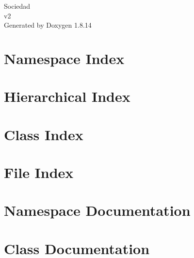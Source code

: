 \documentclass[twoside]{book}
\newcommand{\+}{\discretionary{\mbox{\scriptsize$\hookleftarrow$}}{}{}}
\newcommand{\clearemptydoublepage}{%
  \newpage{\pagestyle{empty}\cleardoublepage}%
}
\begin{document}
\hypersetup{pageanchor=false,
             bookmarksnumbered=true,
             pdfencoding=unicode
            }
\begin{titlepage}
\vspace*{7cm}
\begin{center}%
{\Large Sociedad \\[1ex]\large v2 }\\
\vspace*{1cm}
{\large Generated by Doxygen 1.8.14}\\
\end{center}
\end{titlepage}
\clearemptydoublepage
{}
\tableofcontents
\clearemptydoublepage
{}
\hypersetup{pageanchor=true}

\chapter{Namespace Index}

\chapter{Hierarchical Index}

\chapter{Class Index}

\chapter{File Index}

\chapter{Namespace Documentation}

\chapter{Class Documentation}






















\end{document}

